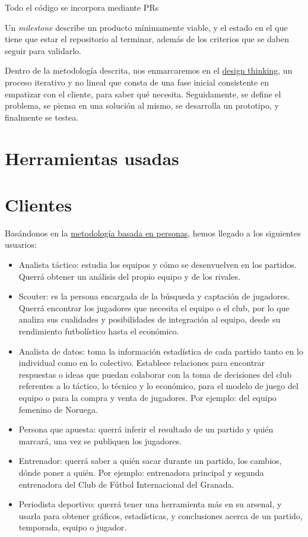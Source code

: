 Todo el código se incorpora mediante PRs

Un \textit{milestone} describe un producto mínimamente viable, y el estado en el que tiene 
que estar el repositorio al terminar, además de los criterios que se daben seguir 
para validarlo.

Dentro de la metodología descrita, nos enmarcaremos en el \href{https://www.iebschool.com/blog/design-thinking-agile-scrum/}{design thinking}, 
un proceso iterativo y no lineal que consta de una fase inicial consistente en empatizar con el 
cliente, para saber qué necesita. Seguidamente, se define el problema, se piensa en una solución al 
mismo, se desarrolla un prototipo, y finalmente se testea. 


\section{Herramientas usadas}


\section{Clientes}
Basándonos en la \href{https://www.designthinking.services/herramientas-design-thinking/metodo-persona/}{metodología basada en personas}, 
hemos llegado a los siguientes usuarios: 
\begin{itemize}
    \item Analista táctico: estudia los equipos y cómo se desenvuelven en los partidos. 
    Querrá obtener un análisis del propio equipo y de los rivales.
    \item Scouter: es la persona encargada de la búsqueda y captación 
    de jugadores. Querrá encontrar los jugadores que necesita el equipo 
    o el club, por lo que analiza sus cualidades y posibilidades de 
    integración al equipo, desde su rendimiento futbolístico hasta el 
    económico.
    \item Analista de datos: toma la información estadística de 
    cada partido tanto en lo individual como en lo colectivo. 
    Establece relaciones para encontrar respuestas o ideas que 
    puedan colaborar con la toma de decisiones del club referentes 
    a lo táctico, lo técnico y lo económico, para el modelo de 
    juego del equipo o para la compra y venta de jugadores. Por ejemplo: del 
    equipo femenino de Noruega. 
    \item Persona que apuesta: querrá inferir el resultado de un partido y 
    quién marcará, una vez se publiquen los jugadores. 
    \item Entrenador: querrá saber a quién sacar durante un partido, los 
    cambios, dónde poner a quién. Por ejemplo: entrenadora principal y 
    segunda entrenadora del Club de Fútbol Internacional del Granada.  
    \item Periodista deportivo: querrá tener una herramienta más en su arsenal, y 
    usarla para obtener gráficos, estadísticas, y conclusiones acerca de un partido, 
    temporada, equipo o jugador.
\end{itemize}


